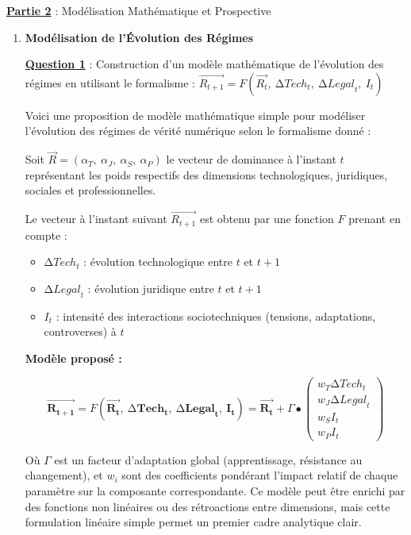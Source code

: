 \documentclass[12pt, a4paper]{article}
\newcommand{\question}[1]{\textbf{\underline{Question #1}}}
\newcommand{\partie}[1]{\textbf{\underline{Partie #1}}}
\begin{document}
	\partie{2} : Modélisation Mathématique et Prospective
	
	\begin{enumerate}[label=\textbf{\arabic*.}, start=3]
		\item \textbf{Modélisation de l'Évolution des Régimes}
		
		\question{1} : Construction d'un modèle mathématique de l'évolution des régimes en utilisant le formalisme : $\overrightarrow{R_{t + 1}} = F(\overrightarrow{R_{t}},\ \mathrm{\Delta}{Tech}_{t},\ \mathrm{\Delta}{Legal}_{t},\ I_{t})$
		
		Voici une proposition de modèle mathématique simple pour modéliser l'évolution des régimes de vérité numérique selon le formalisme donné :
		
		Soit $\overrightarrow{R} = (\alpha_{T},\ \alpha_{J},\ \alpha_{S},\ \alpha_{P})$ le vecteur de dominance à l'instant $t$ représentant les poids respectifs des dimensions technologiques, juridiques, sociales et professionnelles.
		
		Le vecteur à l'instant suivant $\overrightarrow{R_{t + 1}}$ est obtenu par une fonction $F$ prenant en compte :
		
		\begin{itemize}
			\item $\mathrm{\Delta}{Tech}_{t}$ : évolution technologique entre $t$ et $t + 1$
			\item $\mathrm{\Delta}{Legal}_{t}$ : évolution juridique entre $t$ et $t + 1$
			\item $I_{t}$ : intensité des interactions sociotechniques (tensions, adaptations, controverses) à $t$
		\end{itemize}
		
		\textbf{Modèle proposé :}
		
		$$\overrightarrow{\mathbf{R}_{\mathbf{t + 1}}} = F\left( \overrightarrow{\mathbf{R}_{\mathbf{t}}},\ \mathrm{\Delta}\mathbf{Tech}_{\mathbf{t}},\ \mathrm{\Delta}\mathbf{Legal}_{\mathbf{t}},\ \mathbf{I}_{\mathbf{t}} \right) = \overrightarrow{\mathbf{R}_{\mathbf{t}}} + \Gamma \bullet \begin{pmatrix}
			w_{T}\mathrm{\Delta}{Tech}_{t} \\
			w_{J}\mathrm{\Delta}{Legal}_{t} \\
			w_{S}I_{t} \\
			w_{P}I_{t}
		\end{pmatrix}$$
		
		Où $\Gamma$ est un facteur d'adaptation global (apprentissage, résistance au changement), et $w_{i}$ sont des coefficients pondérant l'impact relatif de chaque paramètre sur la composante correspondante. Ce modèle peut être enrichi par des fonctions non linéaires ou des rétroactions entre dimensions, mais cette formulation linéaire simple permet un premier cadre analytique clair.
		

\end{enumerate}
\end{document}
